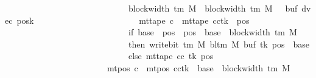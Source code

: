 \begin{isabellebody}
\ \ \ \ \ \ \ \ \ \ \ \ \ \ \ \ \ \ \ \ \ \ \ \ \ \ \ \ \ block{\isacharunderscore}{\kern0pt}width\ {\isacharparenleft}{\kern0pt}{\isasymGamma}{\isacharunderscore}{\kern0pt}tm\ M{\isacharparenright}{\kern0pt}\ {\isacharplus}{\kern0pt}\ {\isacharparenleft}{\kern0pt}block{\isacharunderscore}{\kern0pt}width\ {\isacharparenleft}{\kern0pt}{\isasymGamma}{\isacharunderscore}{\kern0pt}tm\ M{\isacharparenright}{\kern0pt}\ {\isacharminus}{\kern0pt}\ {}{\isacharparenright}{\kern0pt}{\isacharcomma}{\kern0pt}\ buf{\isacharcomma}{\kern0pt}\ dvec{\isacharcomma}{\kern0pt}\ posk{\isacharparenright}{\kern0pt}\isanewline
\ \ \ \ \ \ \ \ \ \ \ \ \ \ \ \ \ \ \ \ \ \ \ {\isasymand}\ mt{\isacharunderscore}{\kern0pt}tape\ c{}\ {\isacharequal}{\kern0pt}\ {\isacharparenleft}{\kern0pt}mt{\isacharunderscore}{\kern0pt}tape\ cc{\isacharparenright}{\kern0pt}{\isacharparenleft}{\kern0pt}tk\ {\isacharcolon}{\kern0pt}{\isacharequal}{\kern0pt}\ {\isacharparenleft}{\kern0pt}{\isasymlambda}pos{\isachardot}{\kern0pt}\isanewline
\ \ \ \ \ \ \ \ \ \ \ \ \ \ \ \ \ \ \ \ \ \ \ \ \ \ \ \ \ if\ base\ {\isasymle}\ pos\ {\isasymand}\ pos\ {\isacharless}{\kern0pt}\ base\ {\isacharplus}{\kern0pt}\ {\isacharparenleft}{\kern0pt}block{\isacharunderscore}{\kern0pt}width\ {\isacharparenleft}{\kern0pt}{\isasymGamma}{\isacharunderscore}{\kern0pt}tm\ M{\isacharparenright}{\kern0pt}\ {\isacharminus}{\kern0pt}\ {}{\isacharparenright}{\kern0pt}\isanewline
\ \ \ \ \ \ \ \ \ \ \ \ \ \ \ \ \ \ \ \ \ \ \ \ \ \ \ \ \ then\ write{\isacharunderscore}{\kern0pt}bit\ {\isacharparenleft}{\kern0pt}{\isasymGamma}{\isacharunderscore}{\kern0pt}tm\ M{\isacharparenright}{\kern0pt}\ {\isacharparenleft}{\kern0pt}bl{\isacharunderscore}{\kern0pt}tm\ M{\isacharparenright}{\kern0pt}\ {\isacharparenleft}{\kern0pt}buf\ tk{\isacharparenright}{\kern0pt}\ {\isacharparenleft}{\kern0pt}pos\ {\isacharminus}{\kern0pt}\ base{\isacharparenright}{\kern0pt}\isanewline
\ \ \ \ \ \ \ \ \ \ \ \ \ \ \ \ \ \ \ \ \ \ \ \ \ \ \ \ \ else\ mt{\isacharunderscore}{\kern0pt}tape\ cc\ tk\ pos{\isacharparenright}{\kern0pt}{\isacharparenright}{\kern0pt}\isanewline
\ \ \ \ \ \ \ \ \ \ \ \ \ \ \ \ \ \ \ \ \ \ \ {\isasymand}\ mt{\isacharunderscore}{\kern0pt}pos\ c{}\ {\isacharequal}{\kern0pt}\ {\isacharparenleft}{\kern0pt}mt{\isacharunderscore}{\kern0pt}pos\ cc{\isacharparenright}{\kern0pt}{\isacharparenleft}{\kern0pt}tk\ {\isacharcolon}{\kern0pt}{\isacharequal}{\kern0pt}\ base\ {\isacharplus}{\kern0pt}\ {\isacharparenleft}{\kern0pt}block{\isacharunderscore}{\kern0pt}width\ {\isacharparenleft}{\kern0pt}{\isasymGamma}{\isacharunderscore}{\kern0pt}tm\ M{\isacharparenright}{\kern0pt}\ {\isacharminus}{\kern0pt}\ {}{\isacharparenright}{\kern0pt}{\isacharparenright}{\kern0pt}{\isachardoublequoteclose}\isanewline

\end{isabellebody}

